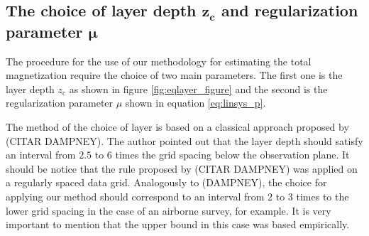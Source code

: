 %
%
%

\subsection{The choice of layer depth $\mathbf{z_c}$ and regularization parameter $\mathbf{\mu}$}

The procedure for the use of our methodology for estimating the total magnetization require the choice of two main parameters. The first one is the layer depth $z_c$ as shown in figure \ref{fig:eqlayer_figure} and the second is the regularization parameter $\mu$ shown in equation \ref{eq:linsys_p}.

The method  of the choice of layer is based on a classical approach proposed by (CITAR DAMPNEY). The author pointed out that the layer depth should satisfy an interval from $2.5$ to $6$ times the grid spacing below the observation plane. It should be notice that the rule proposed by (CITAR DAMPNEY) was applied on a regularly spaced data grid. Analogously to (DAMPNEY), the choice for applying our method should correspond to an interval from $2$ to $3$ times to the lower grid spacing in the case of an airborne survey, for example. It is very important to mention that the upper bound in this case was based empirically.

